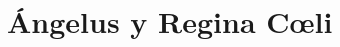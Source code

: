 \documentclass[10pt,oneside]{book}
\begin{document}
\chapter*{Ángelus y Regina C{\oe}li}

\section*{}

\begin{paracol}{2}  
      \\[-3.5mm]
      \switchcolumn
      
      \switchcolumn*
      \\[-3.5mm]
      \switchcolumn
      
      \switchcolumn*
      \\[-3.5mm]
      \switchcolumn
      
      \switchcolumn*
      \\[-3.5mm]
      \switchcolumn
      
      \switchcolumn*
      \\[-3.5mm]
      \switchcolumn
      
      \switchcolumn*
      \\[-3.5mm]
      \switchcolumn
      
      \switchcolumn*
      \\[-3.5mm]
      \switchcolumn
      
      \switchcolumn*
      
      \switchcolumn
                                                                      
\end{paracol}

\section*{}

\begin{paracol}{2}  
      \\[2mm]
      \switchcolumn
      
      \switchcolumn*
      
      \switchcolumn
                                                                    
\end{paracol}
\end{document}

